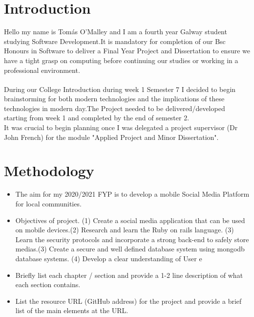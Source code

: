 \chapter{Introduction}

Hello my name is Tomás O'Malley and I am a fourth year Galway student studying Software Development.It is mandatory for completion of our Bsc Honours in Software to deliver a Final Year Project and Dissertation  to ensure we have a tight grasp on computing before continuing our studies or working in a professional environment.\\

\\During our College Introduction during week 1 Semester 7 I decided to begin brainstorming for both modern technologies and the implications of these technologies in modern day.The Project needed to be delivered/developed starting from week 1 and completed by the end of semester 2.\\

It was crucial to begin planning once I was delegated a project supervisor (Dr John French) for the module "Applied Project and Minor Dissertation".





\chapter{Methodology}
\begin{itemize}
\item %
The aim for my 2020/2021 FYP is to develop a mobile  Social Media Platform for local communities.
\item %
Objectives of project. (1) Create a social media application that can be used on mobile devices.(2) Research and learn the Ruby on rails language. (3) Learn the security protocols and incorporate  a strong back-end to safely store medias.(3) Create a secure and well defined database system using mongodb database systems. (4) Develop a clear understanding of User e
\item Briefly list each chapter / section and provide a 1-2 line description of what each section contains.
\item List the resource URL (GitHub address) for the project and provide a brief list of the main elements at the URL.
\end{itemize}



